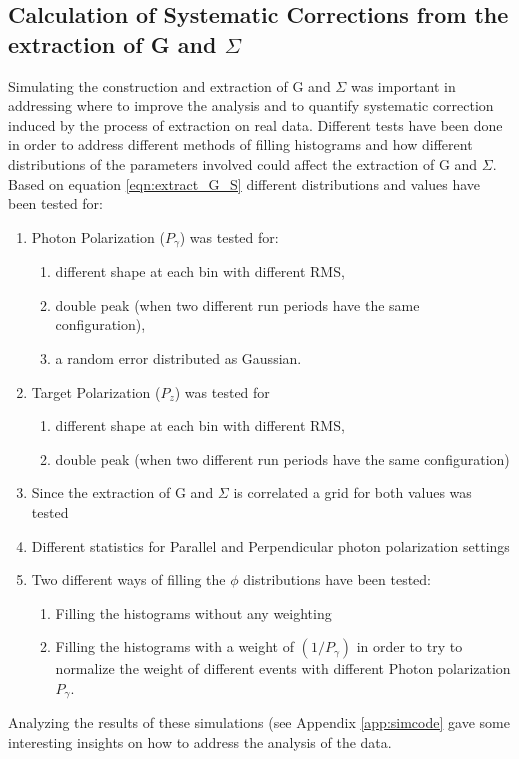 \subsection{Calculation of Systematic Corrections from the extraction of G and \texorpdfstring{$\Sigma$}{Sigma}}
\label{ch:sys_corr}
Simulating the construction and extraction of G and $\Sigma$ was important in addressing where to improve the analysis and to quantify systematic correction induced by the process of extraction on real data. Different tests have been done in order to address different methods of filling histograms and how different distributions of the parameters involved could affect the extraction of G and $\Sigma$. Based on equation \ref{eqn:extract_G_S} different distributions and values have been tested for:
\begin{enumerate}
\item Photon Polarization ($P_{\gamma}$) was tested for:
  \begin{enumerate}
  \item different shape at each bin with different RMS,
  \item double peak (when two different run periods have the same configuration),
  \item a random error distributed as Gaussian.
  \end{enumerate}
\item Target Polarization ($P_z$)  was tested for
  \begin{enumerate}
  \item different shape at each bin with different RMS,
  \item double peak (when two different run periods have the same configuration)
  \end{enumerate}
\item Since the extraction of G and $\Sigma$ is correlated a grid for both values was tested
\item Different statistics for Parallel and Perpendicular photon polarization settings
\item Two different ways of filling the $\phi$ distributions have been tested:
  \begin{enumerate}
  \item Filling the histograms without any weighting
  \item Filling the histograms with a weight of $(1/P_{\gamma})$ in order to try to normalize the weight of different events with different Photon polarization  $P_{\gamma}$.
  \end{enumerate}
\end{enumerate}
Analyzing the results of these simulations (see Appendix \ref{app:simcode} gave some interesting insights on how to address the analysis of the data.

